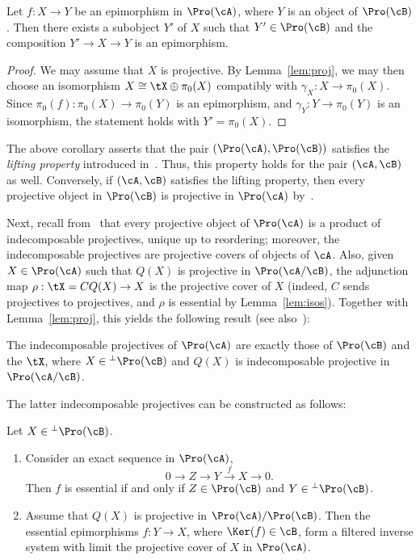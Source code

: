 \begin{coro}\label{cor:lifting}
Let $f: X \to Y$ be an epimorphism in $\Pro(\cA)$, where $Y$ is an object of $\Pro(\cB)$. Then there exists a subobject $Y'$ of $X$ such that $Y' \in \Pro(\cB)$ and the composition $Y' \to X \to Y$ is an epimorphism.
\end{coro}

\begin{proof}
We may assume that $X$ is projective. By Lemma~\ref{lem:proj}, we may then choose an isomorphism $X \cong \tX \oplus \pi_0(X)$ compatibly with $\gamma_X : X \to \pi_0(X)$. Since $\pi_0(f) : \pi_0(X) \to \pi_0(Y)$ is an epimorphism, and $\gamma_Y : Y \to \pi_0(Y)$ is an isomorphism, the statement holds with $Y' = \pi_0(X)$.
\end{proof}

The above corollary asserts that the pair $(\Pro(\cA),\Pro(\cB))$ satisfies the \emph{lifting property} introduced in~\cite[\S 2.2]{Br17b}. Thus, this property holds for the pair $(\cA,\cB)$ as well. Conversely, if $(\cA,\cB)$ satisfies the lifting property, then every projective object in $\Pro(\cB)$ is projective in $\Pro(\cA)$ by~\cite[Lem.~2.14]{Br17b}.

Next, recall from~\cite[V.2.4]{DG} that every projective object of $\Pro(\cA)$ is a product of indecomposable projectives, unique up to reordering; moreover, the indecomposable projectives are projective covers of objects of $\cA$. Also, given $X \in \Pro(\cA)$ such that $Q(X)$ is projective in $\Pro(\cA/\cB)$, the adjunction map $\rho: \tX = CQ(X) \to X$ is the projective cover of $X$ (indeed, $C$ sends projectives to projectives, and $\rho$ is essential by Lemma~\ref{lem:isos}). Together with Lemma~\ref{lem:proj}, this yields the following result (see also~\cite[III.3.Cor.~2]{Gabriel}):

\begin{coro}\label{cor:indproj}
The indecomposable projectives of $\Pro(\cA)$ are exactly those of $\Pro(\cB)$ and the $\tX$, where $X \in {^{\perp}\Pro(\cB)}$ and $Q(X)$ is indecomposable projective in $\Pro(\cA/\cB)$.
\end{coro}

The latter indecomposable projectives can be constructed as follows:

\begin{lemm}\label{lem:ess}
Let $X \in {^{\perp}\Pro(\cB)}$.
\begin{enumerate}\romanenumi
\item \label{2.14.1} Consider an exact sequence in $\Pro(\cA)$,
\[
0 \longrightarrow Z \longrightarrow Y
\stackrel{f}{\longrightarrow} X \longrightarrow 0.
\]
Then $f$ is essential if and only if $Z \in \Pro(\cB)$ and $Y \in {^{\perp} \Pro(\cB)}$.
\item \label{2.14.2} Assume that $Q(X)$ is projective in $\Pro(\cA)/\Pro(\cB)$. Then the essential epimorphisms $f : Y \to X$, where $\Ker(f) \in \cB$, form a filtered inverse system with limit the projective cover of $X$ in $\Pro(\cA)$.
\end{enumerate}
\end{lemm}

